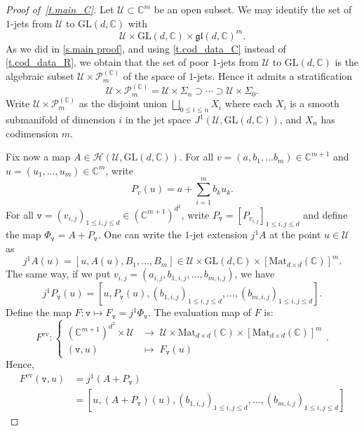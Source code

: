 \documentclass[10pt, a4paper]{amsart}
\theoremstyle{plain}
\theoremstyle{definition}
\theoremstyle{remark}
\theoremstyle{note}
\numberwithin{equation}{section}
\begin{document}
\begin{proof}[Proof of~\cref{t.main_C}]
Let ${\mathcal{U}}\subset {\mathbb{C}}^m$ be an open subset. We may identify the set of $1$-jets from ${\mathcal{U}}$ to ${\mathrm{GL}}(d,{\mathbb{C}})$ with 
$$
{\mathcal{U}}\times {\mathrm{GL}}(d,{\mathbb{C}}) \times  {\mathfrak{gl}}(d,{\mathbb{C}})^m.
$$
As we did in \cref{s.main proof}, 
and using \cref{t.cod_data_C} instead of \cref{t.cod_data_R}, we obtain that the set of poor $1$-jets from ${\mathcal{U}}$ to ${\mathrm{GL}}(d,{\mathbb{C}})$ is the algebraic subset ${\mathcal{U}}\times{\mathcal{P}}_m^{({\mathbb{C}})}$ of the space of $1$-jets. Hence it admits a stratification
$$
{\mathcal{U}}\times{\mathcal{P}}_m^{({\mathbb{C}})}={\mathcal{U}}\times {\Sigma}_n\supset \cdots \supset{\mathcal{U}}\times {\Sigma}_0.
$$
Write ${\mathcal{U}}\times{\mathcal{P}}_m^{({\mathbb{C}})}$ as the disjoint union $\bigsqcup_{0\leq i\leq n} X_i$ where each $X_i$ is a smooth submanifold  of dimension $i$ in the jet space $J^1\left({\mathcal{U}},{\mathrm{GL}}(d,{\mathbb{C}})\right)$, and $X_n$ has codimension $m$.

Fix now a map $A\in \mathcal{H}({\mathcal{U}},{\mathrm{GL}}(d,{\mathbb{C}}))$. For all $v=(a,b_1,\ldots b_m)\in {\mathbb{C}}^{m+1}$ and $u=(u_1, \dots ,u_m)\in {\mathbb{C}}^m$, write 
 $$P_{v}(u)=a+\sum_{i=1}^m b_ku_k.$$
For all $\mathtt{v}= (v_{i,j})_{1\leq i,j\leq d}\in\left({\mathbb{C}}^{m+1}\right)^{d^2}$, write $P_\mathtt{v}=\left[P_{v_{i,j}}\right]_{1\leq i,j\leq d}$ and define the map $\Phi_\mathtt{v}= A+P_\mathtt{v}$.
One can write the $1$-jet extension $j^1 A$ at the point $u\in {\mathcal{U}}$ as 
$$j^1 A(u)= \left[u,A(u),B_1, \dots ,B_m\right]\in {\mathcal{U}} \times {\mathrm{GL}}(d,{\mathbb{C}}) \times \left[\mathrm{Mat}_{d \times d}({\mathbb{C}})\right]^m.$$
The same way, if we put $v_{i,j}=(a_{i,j},b_{1,i,j},\ldots,b_{m,i,j})$, we have
$$j^1P_\mathtt{v}(u)=\left[u,P_\mathtt{v}(u),(b_{1,i,j})_{1\leq i,j\leq d},\ldots,(b_{m,i,j})_{1\leq i,j\leq d}\right].$$
Define the map $F\colon \mathtt{v} \mapsto F_\mathtt{v}=j^1\Phi_\mathtt{v}$. The evaluation map of $F$ is:
$$F^\mathrm{ev}\colon \begin{cases} \left({\mathbb{C}}^{m+1}\right)^{d^2} \times {\mathcal{U}} &\to \; {\mathcal{U}}\times \mathrm{Mat}_{d \times d}({\mathbb{C}}) \times \left[\mathrm{Mat}_{d \times d}({\mathbb{C}})\right]^m\\
                                                          (\mathtt{v},u) &\mapsto \; F_\mathtt{v}(u)
                                     \end{cases}.$$ 
Hence,
\begin{align*}
F^\mathrm{ev}(\mathtt{v},u)&=j^1(A+P_\mathtt{v})\\
&=\left[u,\left(A+P_\mathtt{v}\right)(u),\left(b_{1,i,j}\right)_{1\leq i,j\leq d},\ldots,\left(b_{m,i,j}\right)_{1\leq i,j\leq d}\right]
\end{align*}


\end{proof}
\end{document}
